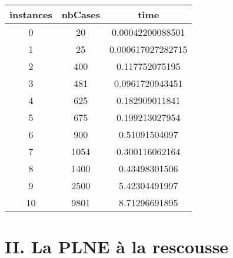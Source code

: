 \documentclass[a4paper]{memoir}
\begin{document}
\begin{tabular}{|c||c||c|}
\hline
instances & nbCases & time \\ 
\hline
0 & 20 & 0.00042200088501 \\ 
\hline
1 & 25 & 0.000617027282715 \\ 
\hline
2 & 400 & 0.117752075195 \\ 
\hline
3 & 481 & 0.0961720943451 \\ 
\hline
4 & 625 & 0.182909011841 \\ 
\hline
5 & 675 & 0.199213027954 \\ 
\hline
6 & 900 & 0.51091504097 \\ 
\hline
7 & 1054 & 0.300116062164 \\ 
\hline
8 & 1400 & 0.43498301506 \\ 
\hline
9 & 2500 & 5.42304491997 \\ 
\hline
10 & 9801 & 8.71296691895 \\ 
\hline
\end{tabular}







 	
 	\newpage
 	\section{II. La PLNE à la rescousse}
\end{document}
